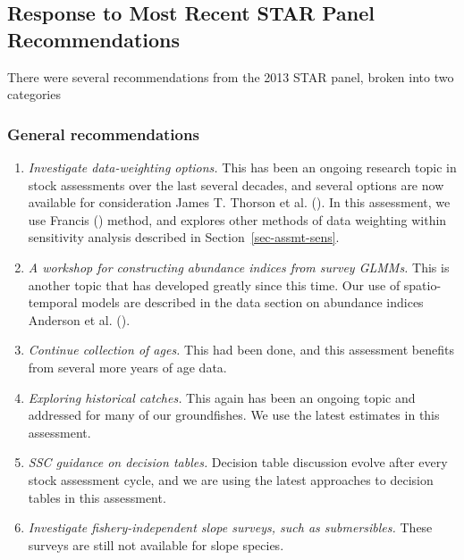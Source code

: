 \documentclass[
]{scrartcl}
\providecommand{\tightlist}{%
  \setlength{\itemsep}{0pt}\setlength{\parskip}{0pt}}\usepackage{longtable,booktabs,array}
\begin{document}
\subsection{Response to Most Recent STAR Panel
Recommendations}\label{response-to-most-recent-star-panel-recommendations}

There were several recommendations from the 2013 STAR panel, broken into
two categories

\subsubsection{General recommendations}\label{general-recommendations}

\begin{enumerate}
\def\labelenumi{\arabic{enumi}.}
\tightlist
\item
  \emph{Investigate data-weighting options.} This has been an ongoing
  research topic in stock assessments over the last several decades, and
  several options are now available for consideration James T. Thorson
  et al. (). In this
  assessment, we use Francis ()
  method, and explores other methods of data weighting within
  sensitivity analysis described in Section~\ref{sec-assmt-sens}.
\item
  \emph{A workshop for constructing abundance indices from survey
  GLMMs.} This is another topic that has developed greatly since this
  time. Our use of spatio-temporal models are described in the data
  section on abundance indices Anderson et al.
  ().
\item
  \emph{Continue collection of ages.} This had been done, and this
  assessment benefits from several more years of age data.
\item
  \emph{Exploring historical catches.} This again has been an ongoing
  topic and addressed for many of our groundfishes. We use the latest
  estimates in this assessment.
\item
  \emph{SSC guidance on decision tables.} Decision table discussion
  evolve after every stock assessment cycle, and we are using the latest
  approaches to decision tables in this assessment.
\item
  \emph{Investigate fishery-independent slope surveys, such as
  submersibles.} These surveys are still not available for slope
  species.
\end{enumerate}
\end{document}
